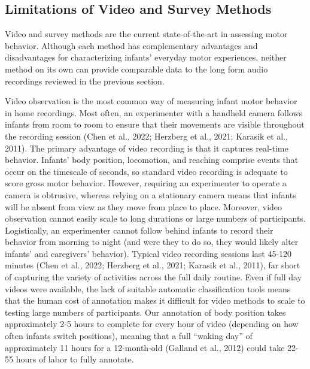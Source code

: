 \documentclass[
  man]{apa6}
\begin{document}
\hypertarget{limitations-of-video-and-survey-methods}{%
\subsection{Limitations of Video and Survey Methods}\label{limitations-of-video-and-survey-methods}}

Video and survey methods are the current state-of-the-art in assessing motor behavior. Although each method has complementary advantages and disadvantages for characterizing infants' everyday motor experiences, neither method on its own can provide comparable data to the long form audio recordings reviewed in the previous section.

Video observation is the most common way of measuring infant motor behavior in home recordings. Most often, an experimenter with a handheld camera follows infants from room to room to ensure that their movements are visible throughout the recording session (Chen et al., 2022; Herzberg et al., 2021; Karasik et al., 2011). The primary advantage of video recording is that it captures real-time behavior. Infants' body position, locomotion, and reaching comprise events that occur on the timescale of seconds, so standard video recording is adequate to score gross motor behavior. However, requiring an experimenter to operate a camera is obtrusive, whereas relying on a stationary camera means that infants will be absent from view as they move from place to place. Moreover, video observation cannot easily scale to long durations or large numbers of participants. Logistically, an experimenter cannot follow behind infants to record their behavior from morning to night (and were they to do so, they would likely alter infants' and caregivers' behavior). Typical video recording sessions last 45-120 minutes (Chen et al., 2022; Herzberg et al., 2021; Karasik et al., 2011), far short of capturing the variety of activities across the full daily routine. Even if full day videos were available, the lack of suitable automatic classification tools means that the human cost of annotation makes it difficult for video methods to scale to testing large numbers of participants. Our annotation of body position takes approximately 2-5 hours to complete for every hour of video (depending on how often infants switch positions), meaning that a full ``waking day'' of approximately 11 hours for a 12-month-old (Galland et al., 2012) could take 22-55 hours of labor to fully annotate.
\end{document}
